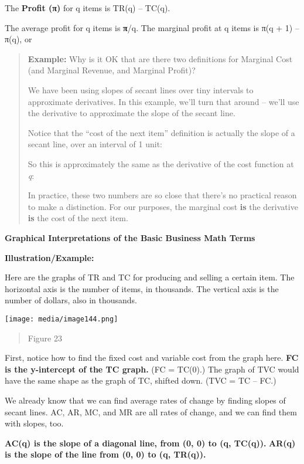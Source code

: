The \textbf{Profit (π)} for q items is TR(q) -- TC(q).

The average profit for q items is \textbf{π}/q. The marginal profit at q
items is π(q + 1) -- π(q), or

\begin{quote}
\textbf{Example:} Why is it OK that are there two definitions for
Marginal Cost (and Marginal Revenue, and Marginal Profit)?

We have been using slopes of secant lines over tiny intervals to
approximate derivatives. In this example, we'll turn that around --
we'll use the derivative to approximate the slope of the secant line.

Notice that the ``cost of the next item'' definition is actually the
slope of a secant line, over an interval of 1 unit:

So this is approximately the same as the derivative of the cost function
at \emph{q}:

In practice, these two numbers are so close that there's no practical
reason to make a distinction. For our purposes, the marginal cost
\textbf{is} the derivative \textbf{is} the cost of the next item.
\end{quote}

\textbf{Graphical Interpretations of the Basic Business Math Terms}

\textbf{Illustration/Example:}

Here are the graphs of TR and TC for producing and selling a certain
item. The horizontal axis is the number of items, in thousands. The
vertical axis is the number of dollars, also in thousands.

\texttt{[image: media/image144.png]}

\begin{quote}
Figure 23
\end{quote}

First, notice how to find the fixed cost and variable cost from the
graph here. \textbf{FC is the y-intercept of the TC graph.} (FC =
TC(0).) The graph of TVC would have the same shape as the graph of TC,
shifted down. (TVC = TC -- FC.)

We already know that we can find average rates of change by finding
slopes of secant lines. AC, AR, MC, and MR are all rates of change, and
we can find them with slopes, too.

\textbf{AC(q) is the slope of a diagonal line, from (0, 0) to (q,
TC(q)).} \textbf{AR(q) is the slope of the line from (0, 0) to (q,
TR(q)).}

